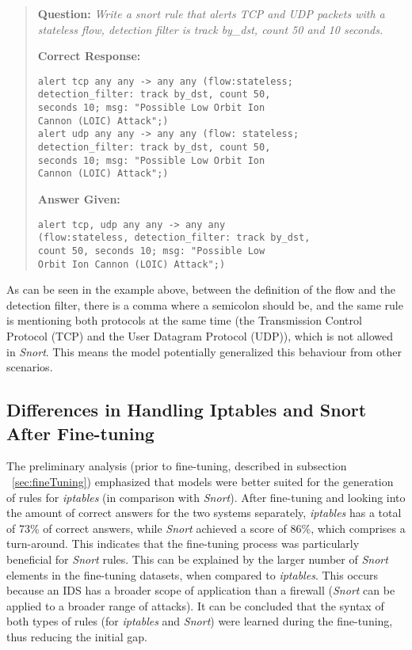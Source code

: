 \documentclass[sigconf]{acmart}
\begin{document}
\begin{quote}
\textbf{Question:} \textit{Write a snort rule that alerts TCP and UDP packets with a stateless flow, detection filter is track by\_dst, count 50 and 10 seconds.}

\textbf{Correct Response:}\begin{verbatim}
alert tcp any any -> any any (flow:stateless; 
detection_filter: track by_dst, count 50, 
seconds 10; msg: "Possible Low Orbit Ion 
Cannon (LOIC) Attack";) 
alert udp any any -> any any (flow: stateless; 
detection_filter: track by_dst, count 50, 
seconds 10; msg: "Possible Low Orbit Ion 
Cannon (LOIC) Attack";)
\end{verbatim}

\textbf{Answer Given:}\begin{verbatim}
alert tcp, udp any any -> any any 
(flow:stateless, detection_filter: track by_dst,
count 50, seconds 10; msg: "Possible Low 
Orbit Ion Cannon (LOIC) Attack";)
\end{verbatim}
\end{quote}
As can be seen in the example above, between the definition of the flow and the detection filter, there is a comma where a semicolon should be, and the same rule is mentioning both protocols at the same time (the Transmission Control Protocol (TCP) and the User Datagram Protocol (UDP)), which is not allowed in \textit{Snort}. This means the model potentially generalized this behaviour from other scenarios.

\subsection{Differences in Handling Iptables and Snort After Fine-tuning}
The preliminary analysis (prior to fine-tuning, described in subsection ~\ref{sec:fineTuning}) emphasized that models were better suited for the generation of rules for \textit{iptables} (in comparison with \textit{Snort}). After fine-tuning and looking into the amount of correct answers for the two systems separately, \textit{iptables} has a total of 73\% of correct answers, while \textit{Snort} achieved a score of 86\%, which comprises a turn-around. This indicates that the fine-tuning process was particularly beneficial for \textit{Snort} rules. This can be explained by the larger number of \textit{Snort} elements in the fine-tuning datasets, when compared to \textit{iptables}. This occurs because an IDS has a broader scope of application than a firewall (\textit{Snort} can be applied to a broader range of attacks). It can be concluded that the syntax of both types of rules (for \textit{iptables} and \textit{Snort}) were learned during the fine-tuning, thus reducing the initial gap.
\end{document}
